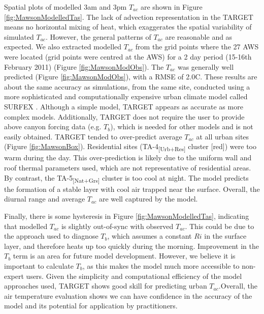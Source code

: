 \documentclass[journal abbreviation, manuscript]{copernicus}
\begin{document}
Spatial plots of modelled 3am and 3pm $T_{ac}$ are shown in Figure \ref{fig:MawsonModelledTas}. The lack of advection representation in the TARGET  means no horizontal mixing of heat, which exaggerates the spatial variability of simulated $T_{ac}$. However, the general patterns of $T_{ac}$ are reasonable and as expected. We also extracted modelled $T_{ac}$ from the grid points where the 27 AWS were located (grid points were centred at the AWS) for a 2 day period (15-16th February 2011) (Figure \ref{fig:MawsonModObs}). The $T_{ac}$ was generally well predicted (Figure \ref{fig:MawsonModObs}), with a RMSE of 2.0\degree C. These results are about the same accuracy as simulations, from the same site, conducted using a more sophisticated and computationally expensive urban climate model called SURFEX \citep{Broadbent}.   Although a simple model, TARGET appears as accurate as more complex models. Additionally, TARGET does not require the user to provide  above canyon forcing data (e.g. \ensuremath{T_{b}}), which is needed for other  models and is  not easily obtained.  TARGET  tended  to over-predict average $T_{ac}$ at all urban sites (Figure \ref{fig:MawsonBox}).  Residential sites ({TA-4\textsubscript{[Urb+Res]} } cluster [red]) were  too warm during the day. This over-prediction is likely due to the uniform wall and roof thermal parameters used, which are not representative of residential areas. By contrast, the {TA-5\textsubscript{[Nat+Grs]} } cluster is too cool at night. The model predicts the formation of a stable layer with cool air trapped near the surface. Overall, the diurnal range and average $T_{ac}$ are well captured by the model. 

Finally, there is some hysteresis in Figure \ref{fig:MawsonModelledTas}, indicating that modelled $T_{ac}$ is slightly out-of-sync with observed $T_{ac}$. This could be due to the approach used to  diagnose \ensuremath{T_{b}}, which assumes a constant \ensuremath{Ri} in the surface layer, and therefore heats up too quickly during the morning. Improvement in the \ensuremath{T_{b}}  term is  an area for future model development. However, we believe it is important to calculate \ensuremath{T_{b}}, as this makes the model much more accessible to non-expert users. Given the simplicity and computational efficiency of the model approaches used, TARGET shows good skill for predicting urban $T_{ac}$.Overall, the air temperature evaluation shows we can have confidence in the accuracy of the model and its potential for application by practitioners. 
\end{document}
